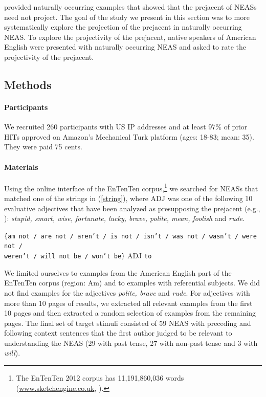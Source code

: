 \documentclass[11pt,fleqn]{article}
\newcommand{\6}{\mbox{$[\hspace*{-.6mm}[$}}
\newcommand{\9}{\mbox{$]\hspace*{-.6mm}]$}}
\begin{document}
\citet{karttunen-etal2014} provided naturally occurring examples that showed that the prejacent of NEASs need not project. The goal of the study we present in this section was to more systematically explore the projection of the prejacent in naturally occurring NEAS. To explore the projectivity of the prejacent, native speakers of American English were presented with naturally occurring NEAS and asked to rate the projectivity of the prejacent.

\subsection{Methods}

\paragraph{Participants} We recruited 260 participants with US IP addresses and at least 97\% of prior HITs approved on Amazon's Mechanical Turk platform (ages: 18-83; mean: 35). They were paid 75 cents.  


\paragraph{Materials} Using the online interface of the EnTenTen corpus,\footnote{The EnTenTen 2012 corpus has 11,191,860,036 words
(\url{www.sketchengine.co.uk}, \citealt{ententen}).} we searched for NEASs that matched one of the strings in (\ref{string}), where ADJ was one of the following 10 evaluative adjectives that have been analyzed as presupposing the prejacent (e.g., \citealt{norrick78,karttunen-etal2014}): {\em stupid, smart, wise,
fortunate, lucky, brave, polite, mean, foolish} and {\em rude}.

\begin{exe}
\ex\label{string} {\tt \{am not / are not / aren't / is not / isn't / was not / wasn't / were not / \\ weren't / will not be / won't be\}} ADJ {\tt to}
\end{exe}
We limited ourselves to examples from the American English part of the EnTenTen corpus (region: Am) and to examples with referential subjects. We did not find examples for the adjectives {\em polite, brave} and {\em rude}. For adjectives with more than 10 pages of results, we extracted all relevant examples from the first 10 pages and then extracted a random selection of examples from the remaining pages. The final set of target stimuli consisted of 59 NEAS with preceding and following context sentences that the first author judged to be relevant to understanding the NEAS (29 with past tense, 27 with non-past tense and 3 with {\em will}).
\end{document}
